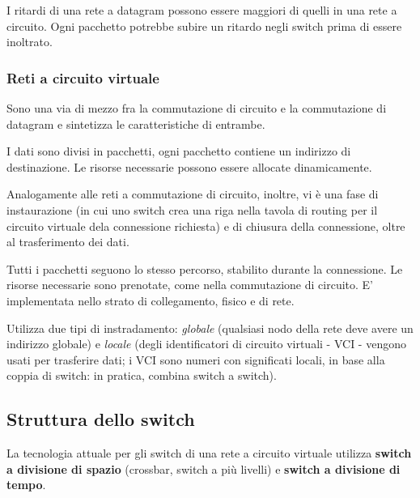             \vspace{3mm}
            
            I ritardi di una rete a datagram possono essere maggiori di quelli in una rete a circuito. Ogni pacchetto potrebbe subire un ritardo negli switch prima di essere inoltrato.
            
        \subsubsection{Reti a circuito virtuale}
        
            Sono una via di mezzo fra la commutazione di circuito e la commutazione di datagram e sintetizza le caratteristiche di entrambe.
            
            I dati sono divisi in pacchetti, ogni pacchetto contiene un indirizzo di destinazione. Le risorse necessarie possono essere allocate dinamicamente.
            
            \vspace{3mm}
            
            Analogamente alle reti a commutazione di circuito, inoltre, vi è una fase di instaurazione (in cui uno switch crea una riga nella tavola di routing per il circuito virtuale dela connessione richiesta) e di chiusura della connessione, oltre al trasferimento dei dati. 
            
            Tutti i pacchetti seguono lo stesso percorso, stabilito durante la connessione. Le risorse necessarie sono prenotate, come nella commutazione di circuito. E' implementata nello strato di collegamento, fisico e di rete.
            
            \vspace{3mm}
            
            Utilizza due tipi di instradamento: \textit{globale} (qualsiasi nodo della rete deve avere un indirizzo globale) e \textit{locale} (degli identificatori di circuito virtuali - VCI - vengono usati per trasferire dati; i VCI sono numeri con significati locali, in base alla coppia di switch: in pratica, combina switch a switch).
            
    \subsection{Struttura dello switch}
    
        La tecnologia attuale per gli switch di una rete a circuito virtuale utilizza \textbf{switch a divisione di spazio} (crossbar, switch a più livelli) e \textbf{switch a divisione di tempo}.
        

